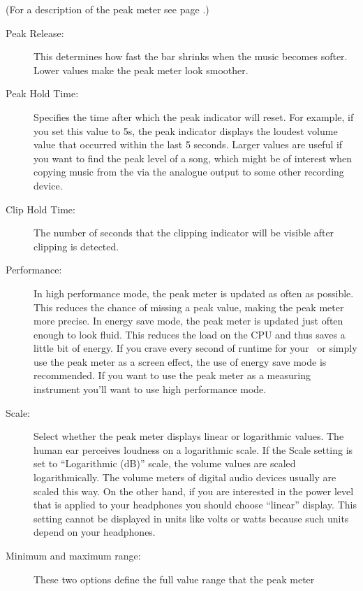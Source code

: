 \begin{description}
{      (For a description of the peak meter see page \pageref{sec:peakmeter}.)
      \begin{description}
      \item[Peak Release:]
        This determines how fast the bar shrinks when the music becomes 
        softer. Lower values make the peak meter look smoother.
      \item[Peak Hold Time:]
        Specifies the time after which the peak indicator will reset.  
        For example, if you set this value to 5s, the peak indicator displays 
        the loudest volume value that occurred within the last 5 seconds.  
        Larger values are useful if you want to find the peak level of a song, 
        which might be of interest when copying music from the \dap via the 
        analogue output to some other recording device.
      \item[Clip Hold Time:]
        The number of seconds that the clipping indicator will be visible 
        after clipping is detected.
      \item[Performance:]
        In high performance mode, the peak meter is updated as often as 
        possible. This reduces the chance of missing a peak value, making 
        the peak meter more precise. In energy save mode, the peak meter is 
        updated just often enough to look fluid.  This reduces the load on 
        the CPU and thus saves a little bit of energy.  If you crave every 
        second of runtime for your \dap\ or simply use the peak meter as a 
        screen effect, the use of energy save mode is recommended.  If you 
        want to use the peak meter as a measuring instrument you'll want to 
        use high performance mode.  
      \item[Scale:]
        Select whether the peak meter displays linear or logarithmic values. 
        The human ear perceives loudness on a logarithmic scale.  If the 
        Scale setting is set to ``Logarithmic (dB)'' scale, the volume values 
        are scaled logarithmically.  The volume meters of digital audio 
        devices usually are scaled this way.  On the other hand, if you 
        are interested in the power level that is applied to your headphones 
        you should choose ``linear'' display.  This setting cannot be 
        displayed in units like volts or watts because such units depend 
        on your headphones.
      \item[Minimum and maximum range:]
        These two options define the full value range that the peak meter 

\end{description}}
\end{description}
